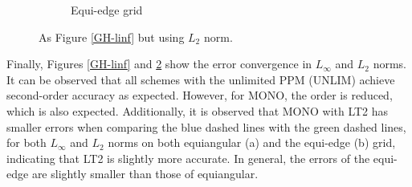 \documentclass[preprint,12pt]{elsarticle}
\begin{document}
\begin{linenumbers}
\begin{figure}[!htb]
\begin{subfigure}{0.45\textwidth}
		\caption{Equi-edge grid\label{GH-equiedge-l2}}
	\end{subfigure}
	\caption{As Figure \ref{GH-linf} but using $L_2$ norm.
		\label{GH-l2}}
\end{figure}
Finally, Figures \ref{GH-linf} and \ref{GH-l2} show the error convergence in $L_{\infty}$ and $L_{2}$ norms.
It can be observed that all schemes with the unlimited PPM (UNLIM) achieve second-order accuracy as expected.
However, for MONO, the order is reduced, which is also expected.
Additionally, it is observed that MONO with LT2 has smaller errors when comparing the blue dashed lines with the green dashed lines, 
for both $L_{\infty}$ and $L_{2}$ norms on both equiangular (a) and the equi-edge (b) grid, indicating that LT2 is slightly more accurate.
In general, the errors of the equi-edge are slightly smaller than those of equiangular.


\end{linenumbers}
\end{document}
